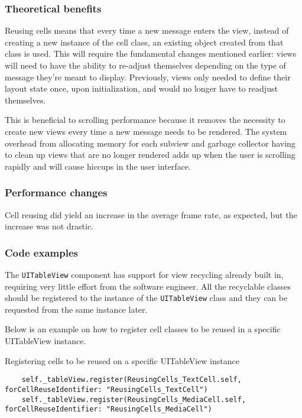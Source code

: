 \documentclass[a4paper,12pt]{article}
\begin{document}
\subsubsection*{Theoretical benefits}
Reusing cells means that every time a new message enters the view, instead of creating a new instance of the cell class, an existing object created from that class is used. This will require the fundamental changes mentioned earlier: views will need to have the ability to re-adjust themselves depending on the type of message they're meant to display. Previously, views only needed to define their layout state once, upon initialization, and would no longer have to readjust themselves.

This is beneficial to scrolling performance because it removes the necessity to create new views every time a new message needs to be rendered. The system overhead from allocating memory for each subview and garbage collector having to clean up views that are no longer rendered adds up when the user is scrolling rapidly and will cause hiccups in the user interface.

\subsubsection*{Performance changes}
Cell reusing did yield an increase in the average frame rate, as expected, but the increase was not drastic.


\subsubsection*{Code examples}
The \texttt{UITableView} component has support for view recycling already built in, requiring very little effort from the software engineer. All the recyclable classes should be registered to the instance of the \texttt{UITableView} class and they can be requested from the same instance later.

Below is an example on how to register cell classes to be reused in a specific UITableView instance.
\begin{listing}[H]
  \caption{Registering cells to be reused on a specific UITableView instance}
  \begin{verbatim}
    self._tableView.register(ReusingCells_TextCell.self, forCellReuseIdentifier: "ReusingCells_TextCell")
    self._tableView.register(ReusingCells_MediaCell.self, forCellReuseIdentifier: "ReusingCells_MediaCell")
  \end{verbatim}
\end{listing}
\end{document}
